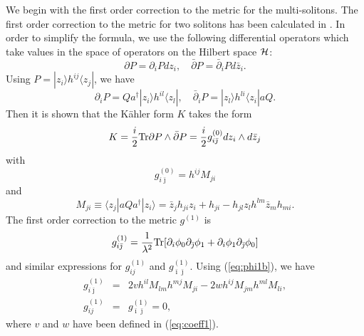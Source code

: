 \documentclass[a4paper,12pt]{article}
\begin{document}
We begin with  the first
order correction to the metric for the multi-solitons.
The first order correction to the metric for two solitons has been
calculated in \cite{HLRU}.
In order to simplify the formula, we use the following differential
operators which take values in the space of operators on the Hilbert
space ${\cal H}$:
\begin{equation}
\partial P=\partial_{i}P d z_{i},\quad
\bar{\partial}P=\bar{\partial}_{i}P d\bar{z}_{i}.
\end{equation}
Using $P=|z_{i}\rangle h^{ij} \langle z_{j}|$, we have
\begin{equation}
 \partial_{i}P=Q a^{\dagger} |z_{i}\rangle h^{il} \langle z_{l}|,
\quad  \bar{\partial}_{i}P=|z_{l}\rangle  h^{li} \langle z_{i}|a Q.
\end{equation}
Then it is shown that the K\"ahler form $K$ takes the form \cite{GHS}
\begin{equation}
 K={i\over 2}{\rm Tr}\partial P\wedge \bar{\partial}P
={i\over 2}g^{(0)}_{i\bar{\jmath}}dz_{i}\wedge d\bar{z}_{j}
\end{equation}
with
\begin{equation}
 g^{(0)}_{i\bar{\jmath}}=h^{ij} M_{ji}
\label{eq:g0a}
\end{equation}
and
\begin{equation}
 M_{ji}\equiv \langle z_{j}|aQa^{\dagger}| z_{i}\rangle
=\bar{z}_{j}h_{ji}z_{i}+h_{ji}-h_{jl}z_{l}h^{lm}\bar{z}_{m}h_{mi}.
\label{eq:M}
\end{equation}
The first order correction to the metric $g^{(1)}$ is
\begin{equation}
 g^{(1)}_{i\bar{\jmath}}={1\over\lambda^2}
{\rm Tr}[\partial_{i}\phi_{0}\partial_{\bar{\jmath}}\phi_{1}
+\partial_{i}\phi_{1}\partial_{\bar{\jmath}}\phi_{0}]
\end{equation}
and similar expressions for $g^{(1)}_{ij}$ and
$g^{(1)}_{\bar{\imath}\bar{\jmath}}$.
Using (\ref{eq:phi1b}), we have
\begin{eqnarray}
 g^{(1)}_{i\bar{\jmath}}&=&2vh^{il}M_{lm}h^{mj}M_{ji}
-2w h^{ij} M_{jm} h^{ml} M_{li},\nonumber\\
g^{(1)}_{ij}&=& g^{(1)}_{\bar{\imath}\bar{\jmath}}=0,
\end{eqnarray}
where $v$ and $w$ have been defined in (\ref{eq:coeff1}).
\end{document}
